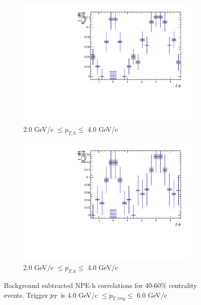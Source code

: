 \begin{figure}[htbp]
\begin{subfigure}{0.5\textwidth}
		\includegraphics[width=\textwidth]{Plots/Correlations/subtracted/NPE_eh_corr_subtracted_primpt_4_5_cent_2_3_assopt_3_4.pdf}
		\caption{2.0 GeV/c $\leq p_{T,h} \leq$ 4.0 GeV/c}
		\label{fig:Sub4060e}
	\end{subfigure}	
	\begin{subfigure}{0.5\textwidth}
		\includegraphics[width=\textwidth]{Plots/Correlations/subtracted/NPE_eh_corr_subtracted_primpt_6_8_cent_2_3_assopt_3_4.pdf}
		\caption{2.0 GeV/c $\leq p_{T,h} \leq$ 4.0 GeV/c}
		\label{fig:Sub4060f}
	\end{subfigure}	
\caption[Subtracted Correlations 40-60\% Centrality]{Background subtracted NPE-h correlations for 40-60\% centrality events. Trigger $p_{T}$ is 4.0 GeV/c $\leq p_{T,trig} \leq$ 6.0 GeV/c}
\label{fig:Sub4060}
\end{figure}

